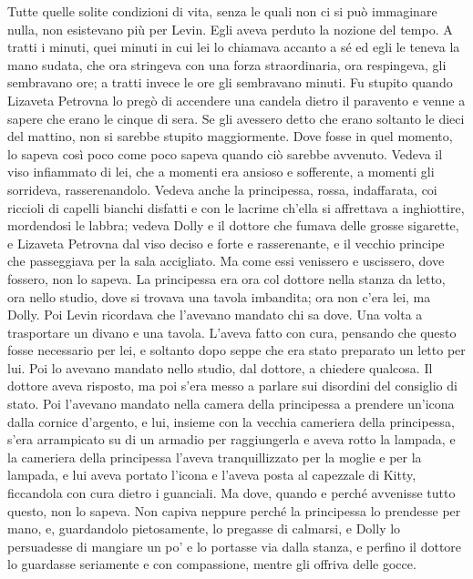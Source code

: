 Tutte quelle solite condizioni di vita, senza le quali non ci si può immaginare nulla, non esistevano più per Levin. Egli aveva perduto la nozione del tempo. A tratti i minuti, quei minuti in cui lei lo chiamava accanto a sé ed egli le teneva la mano sudata, che ora stringeva con una forza straordinaria, ora respingeva, gli sembravano ore; a tratti invece le ore gli sembravano minuti. Fu stupito quando Lizaveta Petrovna lo pregò di accendere una candela dietro il paravento e venne a sapere che erano le cinque di sera. Se gli avessero detto che erano soltanto le dieci del mattino, non si sarebbe stupito maggiormente. Dove fosse in quel momento, lo sapeva così poco come poco sapeva quando ciò sarebbe avvenuto. Vedeva il viso infiammato di lei, che a momenti era ansioso e sofferente, a momenti gli sorrideva, rasserenandolo. Vedeva anche la principessa, rossa, indaffarata, coi riccioli di capelli bianchi disfatti e con le lacrime ch'ella si affrettava a inghiottire, mordendosi le labbra; vedeva Dolly e il dottore che fumava delle grosse sigarette, e Lizaveta Petrovna dal viso deciso e forte e rasserenante, e il vecchio principe che passeggiava per la sala accigliato. Ma come essi venissero e uscissero, dove fossero, non lo sapeva. La principessa era ora col dottore nella stanza da letto, ora nello studio, dove si trovava una tavola imbandita; ora non c'era lei, ma Dolly. Poi Levin ricordava che l'avevano mandato chi sa dove. Una volta a trasportare un divano e una tavola. L'aveva fatto con cura, pensando che questo fosse necessario per lei, e soltanto dopo seppe che era stato preparato un letto per lui. Poi lo avevano mandato nello studio, dal dottore, a chiedere qualcosa. Il dottore aveva risposto, ma poi s'era messo a parlare sui disordini del consiglio di stato. Poi l'avevano mandato nella camera della principessa a prendere un'icona dalla cornice d'argento, e lui, insieme con la vecchia cameriera della principessa, s'era arrampicato su di un armadio per raggiungerla e aveva rotto la lampada, e la cameriera della principessa l'aveva tranquillizzato per la moglie e per la lampada, e lui aveva portato l'icona e l'aveva posta al capezzale di Kitty, ficcandola con cura dietro i guanciali. Ma dove, quando e perché avvenisse tutto questo, non lo sapeva. Non capiva neppure perché la principessa lo prendesse per mano, e, guardandolo pietosamente, lo pregasse di calmarsi, e Dolly lo persuadesse di mangiare un po' e lo portasse via dalla stanza, e perfino il dottore lo guardasse seriamente e con compassione, mentre gli offriva delle gocce. 

